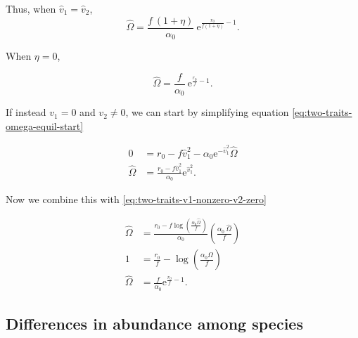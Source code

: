 Thus, when $\hat{v}_1 = \hat{v}_2$,
$$
\hat{\Omega} = \frac{ f ~ ( 1 + \eta ) }{ \alpha_0 } ~
        \textrm{e}^{\frac{ r_0 }{ f ( 1 + \eta ) } - 1 }
    \textrm{.}
$$


\noindent When $\eta = 0$,

$$
    \hat{\Omega} = \frac{ f }{ \alpha_0 } ~ \textrm{e}^{\frac{ r_0 }{ f } - 1 }
    \textrm{.}
$$



If instead $v_1 = 0$ and $v_2 \ne 0$, we can start by simplifying equation
\ref{eq:two-traits-omega-equil-start}

\begin{equation*}
\begin{split}
    0 &= r_0 - f \hat{v}_{1}^2 -
        \alpha_0 \textrm{e}^{ - \hat{v}_{1}^2 } \hat{\Omega} \\
    \hat{\Omega} &= \frac{ r_0 - f \hat{v}_{1}^2 }{ \alpha_0 } \textrm{e}^{ \hat{v}_{1}^2 }
    \textrm{.}
\end{split}
\end{equation*}

Now we combine this with \ref{eq:two-traits-v1-nonzero-v2-zero}

\begin{equation*}
\begin{split}
    \hat{\Omega} &= \frac{ r_0 - f \log \left( \frac{\alpha_0 \hat{\Omega}}{f} \right) }{
        \alpha_0 } \left( \frac{\alpha_0 ~ \hat{\Omega}}{f} \right) \\
    1 &= \frac{ r_0 }{ f } - \log \left( \frac{\alpha_0 \hat{\Omega}}{f} \right) \\
    \hat{\Omega} &= \frac{f}{\alpha_0} \textrm{e}^{\frac{r_0}{f} - 1}
    \textrm{.}
\end{split}
\end{equation*}

















\subsection*{Differences in abundance among species}


